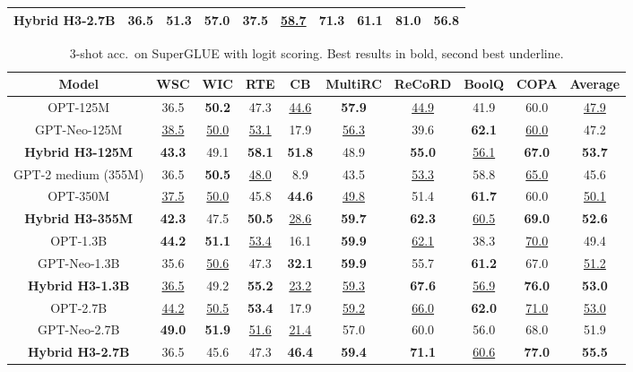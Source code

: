\documentclass{article}
\newcommand{\hthree}{\textsc{H3}\xspace}
\begin{document}
\begin{table}[t]
{\begin{tabular}{@{}|c|cccccccc|c|@{}}
        \textbf{Hybrid \hthree-2.7B} & 36.5 & \textbf{51.3} & \textbf{57.0} & 37.5 & \underline{58.7} & \textbf{71.3} & \textbf{61.1} & \textbf{81.0} & \textbf{56.8} \\ \hline
        \end{tabular}
    }
\end{table} \begin{table}[t]
\scriptsize
    \centering
\caption{\label{table:superglue_fewshot_logit} 3-shot acc.\ on SuperGLUE with logit scoring. Best results in bold, second best underline. }
{
        \begin{tabular}{@{}|c|cccccccc|c|@{}}
            \hline
Model & WSC & WIC & RTE & CB & MultiRC & ReCoRD & BoolQ & COPA & Average \\ \hline
OPT-125M & 36.5 & \textbf{50.2} & 47.3 & \underline{44.6} & \textbf{57.9} & \underline{44.9} & 41.9 & 60.0 & \underline{47.9} \\
        GPT-Neo-125M & \underline{38.5} & \underline{50.0} & \underline{53.1} & 17.9 & \underline{56.3} & 39.6 & \textbf{62.1} & \underline{60.0} & 47.2 \\
        \textbf{Hybrid \hthree-125M} & \textbf{43.3} & 49.1 & \textbf{58.1} & \textbf{51.8} & 48.9 & \textbf{55.0} & \underline{56.1} & \textbf{67.0} & \textbf{53.7} \\ \hline GPT-2 medium (355M) & 36.5 & \textbf{50.5} & \underline{48.0} & 8.9 & 43.5 & \underline{53.3} & 58.8 & \underline{65.0} & 45.6 \\
OPT-350M & \underline{37.5} & \underline{50.0} & 45.8 & \textbf{44.6} & \underline{49.8} & 51.4 & \textbf{61.7} & 60.0 & \underline{50.1} \\
        \textbf{Hybrid \hthree-355M} & \textbf{42.3} & 47.5 & \textbf{50.5} & \underline{28.6} & \textbf{59.7} & \textbf{62.3} & \underline{60.5} & \textbf{69.0} & \textbf{52.6} \\ \hline
OPT-1.3B & \textbf{44.2} & \textbf{51.1} & \underline{53.4} & 16.1 & \textbf{59.9} & \underline{62.1} & 38.3 & \underline{70.0} & 49.4 \\
        GPT-Neo-1.3B & 35.6 & \underline{50.6} & 47.3 & \textbf{32.1} & \textbf{59.9} & 55.7 & \textbf{61.2} & 67.0 & \underline{51.2} \\
        \textbf{Hybrid \hthree-1.3B} & \underline{36.5} & 49.2 & \textbf{55.2} & \underline{23.2} & \underline{59.3} & \textbf{67.6} & \underline{56.9} & \textbf{76.0} & \textbf{53.0} \\ \hline
        OPT-2.7B & \underline{44.2} & \underline{50.5} & \textbf{53.4} & 17.9 & \underline{59.2} & \underline{66.0} & \textbf{62.0} & \underline{71.0} & \underline{53.0} \\
        GPT-Neo-2.7B & \textbf{49.0} & \textbf{51.9} & \underline{51.6} & \underline{21.4} & 57.0 & 60.0 & 56.0 & 68.0 & 51.9 \\
        \textbf{Hybrid \hthree-2.7B} & 36.5 & 45.6 & 47.3 & \textbf{46.4} & \textbf{59.4} & \textbf{71.1} & \underline{60.6} & \textbf{77.0} & \textbf{55.5} \\ \hline
        \end{tabular}
    }
\end{table} 
\end{document}
